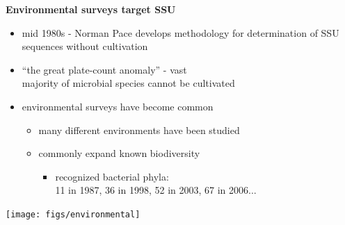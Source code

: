 \documentclass[landscape]{slides}
\begin{document}
\begin{slide}
\begin{center}
\large
\textbf{Environmental surveys target SSU}
\end{center}
\medskip
\begin{minipage}{7in}
\small
\begin{itemize}
\item
mid 1980s - Norman Pace develops methodology for determination of SSU
sequences without cultivation
\item
``the great plate-count anomaly'' - vast \\ majority of microbial species
  cannot be cultivated
\item
environmental surveys have become common
\begin{itemize}
  \item
    many different environments have been studied
  \item
    commonly expand known biodiversity
    \begin{itemize}
      \item
	recognized bacterial phyla: \\
	11 in 1987, 36 in 1998, 52 in 2003, 67 in 2006...
    \end{itemize}
\end{itemize}
\end{itemize}

\vspace{.7in}
\end{minipage}
\hspace{0.1in}
\begin{minipage}{3in}
\texttt{[image: figs/environmental]}
\vspace{1in}
\end{minipage}
\end{slide}
\end{document}
